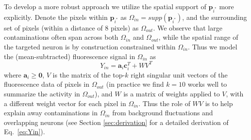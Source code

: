 \documentclass[10pt,letterpaper]{article}
\begin{document}
{%

To develop a more robust approach we utilize the spatial support of $\bm{p}_{i^*}$ more explicitly.  Denote the pixels within $\bm{p}_{i^*}$ as $\Omega_{in} = supp(\bm{p}_{i^*})$, and the surrounding set of pixels (within a distance of 8 pixels) as $\Omega_{out}$. We observe that large contaminations often span across both $\Omega_{in}$ and $\Omega_{out}$, while the spatial range of the targeted neuron is by construction constrained within $\Omega_{in}$. Thus we model the (mean-subtracted) fluorescence signal in $\Omega_{in}$ as 
\begin{equation}
	Y_{in} = \bm{a}_i\bm{c}_i^T + WV^T \label{eq:Yin}
\end{equation}
where $\bm{a}_i\geq \bm{0}$, $V$ is the matrix of the top-$k$ right singular unit vectors of the fluorescence data of pixels in $\Omega_{out}$ (in practice we find $k=10$ works well to summarize the activity in $\Omega_{out}$), and $W$ is a matrix of weights applied to $V$, with a different weight vector for each pixel in $\Omega_{in}$.  Thus the role of $WV$ is to help explain away contaminations in $\Omega_{in}$ from background fluctuations and overlapping neurons (see Section \ref{sec:derivation} for a detailed derivation of Eq.~\ref{eq:Yin}). 

}
\end{document}
